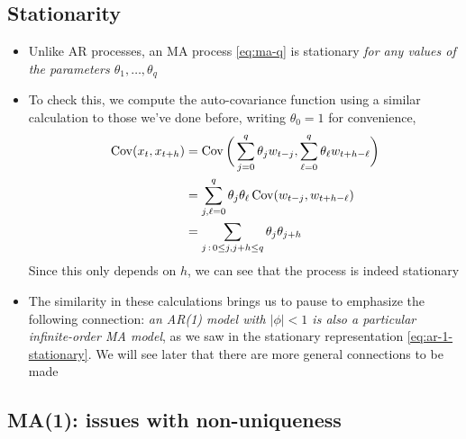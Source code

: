 \documentclass{article}
\begin{document}
\subsection{Stationarity}

\begin{itemize}
\item Unlike AR processes, an MA process \eqref{eq:ma-q} is stationary \emph{for
    any values of the parameters $\theta_1,\dots,\theta_q$}

\item To check this, we compute the auto-covariance function using a similar
  calculation to those we've done before, writing $\theta_0 = 1$ for
  convenience,
  \begin{align}
  \nonumber
  \operatorname{Cov}(x_t, x_{t+h}) &= \operatorname{Cov}\bigg( \sum_{j=0}^q \theta_j w_{t-j}, 
  \sum_{\ell=0}^q \theta_\ell w_{t+h-\ell} \bigg) \\
  \nonumber
  &= \sum_{j,\ell=0}^q \theta_j \theta_\ell \operatorname{Cov}( w_{t-j}, w_{t+h-\ell} ) \\
  \label{eq:ma-q-auto-cov}
  &= \sum_{j \,:\, 0 \leq j,  j +h \leq q} \theta_j \theta_{j+h} 
  \end{align}
  Since this only depends on $h$, we can see that the process is indeed
  stationary 

\item The similarity in these calculations brings us to pause to emphasize the
  following connection: \emph{an AR(1) model with $|\phi| < 1$ is also a
    particular infinite-order MA model}, as we saw in the stationary
  representation \eqref{eq:ar-1-stationary}. We will see later that there are
  more general connections to be made
\end{itemize}

\subsection{MA(1): issues with non-uniqueness}
\end{document}
